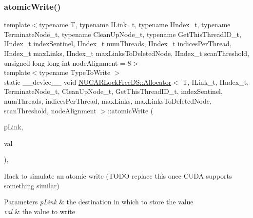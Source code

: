 \subsubsection{\texorpdfstring{atomic\+Write()}{atomicWrite()}}
{\footnotesize\ttfamily template$<$typename T, typename I\+Link\+\_\+t, typename I\+Index\+\_\+t, typename Terminate\+Node\+\_\+t, typename Clean\+Up\+Node\+\_\+t, typename Get\+This\+Thread\+I\+D\+\_\+t, I\+Index\+\_\+t index\+Sentinel, I\+Index\+\_\+t num\+Threads, I\+Index\+\_\+t indices\+Per\+Thread, I\+Index\+\_\+t max\+Links, I\+Index\+\_\+t max\+Links\+To\+Deleted\+Node, I\+Index\+\_\+t scan\+Threshold, unsigned long long int node\+Alignment = 8$>$ \\
template$<$typename Type\+To\+Write $>$ \\
static \+\_\+\+\_\+device\+\_\+\+\_\+ void \mbox{\hyperlink{class_n_u_c_a_r_lock_free_d_s_1_1_allocator}{N\+U\+C\+A\+R\+Lock\+Free\+D\+S\+::\+Allocator}}$<$ T, I\+Link\+\_\+t, I\+Index\+\_\+t, Terminate\+Node\+\_\+t, Clean\+Up\+Node\+\_\+t, Get\+This\+Thread\+I\+D\+\_\+t, index\+Sentinel, num\+Threads, indices\+Per\+Thread, max\+Links, max\+Links\+To\+Deleted\+Node, scan\+Threshold, node\+Alignment $>$\+::atomic\+Write (\begin{DoxyParamCaption}\item[{Type\+To\+Write $\ast$}]{p\+Link,  }\item[{const Type\+To\+Write \&}]{val }\end{DoxyParamCaption})\hspace{0.3cm}{\ttfamily [inline]}, {\ttfamily [static]}}

Hack to simulate an atomic write (T\+O\+DO replace this once C\+U\+DA supports something similar) 
\begin{DoxyParams}{Parameters}
{\em p\+Link} & the destination in which to store the value \\
\hline
{\em val} & the value to write \\
\hline
\end{DoxyParams}
\mbox{\label{class_n_u_c_a_r_lock_free_d_s_1_1_allocator_a0498950ecff0d5354daab89e8f12d6d5}} 
